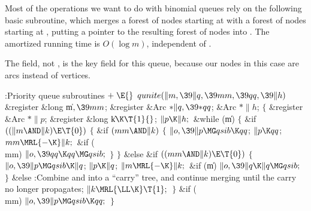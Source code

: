 Most of the operations we want to do with binomial queues rely on
the following basic subroutine, which merges a forest of  nodes
starting at  with a forest of  nodes starting at , putting
a pointer to the resulting forest of  nodes into .
The amortized running time is $O(\log m)$, independent of .

The  field, not , is the key field for this queue,
because our
nodes in this case are arcs instead of vertices.

\Y\B\4:Priority queue subroutines\X${}\mathrel+\E{}$\6
\1\1${}\\{qunite}(\|m,\39\|q,\39\\{mm},\39\\{qq},\39\|h){}$\6
\&{register} \&{long} \|m${},\39\\{mm}{}$;\6
\&{register} \&{Arc} ${}{*}\|q,\39{*}\\{qq}{}$;\6
\&{Arc} ${}{*}\|h{}$;\2\2\6
${}\{{}$\5
\1\&{register} \&{Arc} ${}{*}\|p{}$;\6
\&{register} \&{long} \|k${}\K\T{1}{}$;\7
${}\|p\K\|h;{}$\6
\&{while} (\|m)\5
${}\{{}$\1\6
\&{if} ${}((\|m\AND\|k)\E\T{0}){}$\5
${}\{{}$\1\6
\&{if} ${}(\\{mm}\AND\|k){}$\5
${}\{{}$\1\6
${}\|o,\39\|p\MG\\{qsib}\K\\{qq}{}$;\5
${}\|p\K\\{qq}{}$;\5
${}\\{mm}\MRL{-{\K}}\|k;{}$\6
\&{if} (\\{mm})\1\5
${}\|o,\39\\{qq}\K\\{qq}\MG\\{qsib};{}$\2\6
\4${}\}{}$\2\6
\4${}\}{}$\5
\2\&{else} \&{if} ${}((\\{mm}\AND\|k)\E\T{0}){}$\5
${}\{{}$\1\6
${}\|o,\39\|p\MG\\{qsib}\K\|q{}$;\5
${}\|p\K\|q{}$;\5
${}\|m\MRL{-{\K}}\|k;{}$\6
\&{if} (\|m)\1\5
${}\|o,\39\|q\K\|q\MG\\{qsib};{}$\2\6
\4${}\}{}$\5
\2\&{else}\1\5
:Combine  and  into a ``carry'' tree, and continue
merging until the carry no longer propagates\X;\2\6
${}\|k\MRL{{\LL}{\K}}\T{1};{}$\6
\4${}\}{}$\2\6
\&{if} (\\{mm})\1\5
${}\|o,\39\|p\MG\\{qsib}\K\\{qq};{}$\2\6
\4${}\}{}$\2\par
\fi

